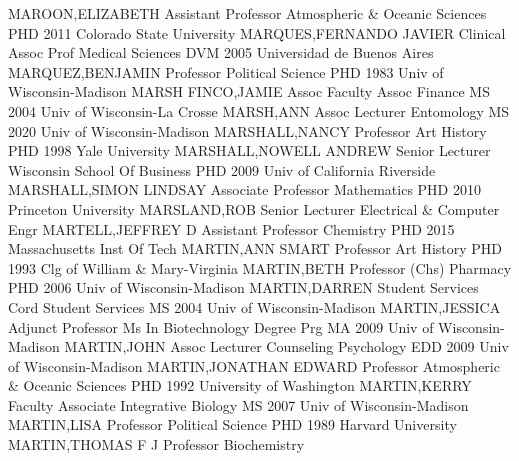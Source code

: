 \documentclass[
]{article}
\begin{document}
\textbar MAROON,ELIZABETH \textbar Assistant Professor
\textbar Atmospheric \& Oceanic Sciences \textbar PHD 2011 Colorado
State University \textbar{}  \textbar MARQUES,FERNANDO
JAVIER \textbar Clinical Assoc Prof \textbar Medical Sciences
\textbar DVM 2005 Universidad de Buenos Aires \textbar{} 
\textbar MARQUEZ,BENJAMIN \textbar Professor \textbar Political Science
\textbar PHD 1983 Univ of Wisconsin-Madison \textbar{} 
\textbar MARSH FINCO,JAMIE \textbar Assoc Faculty Assoc \textbar Finance
\textbar MS 2004 Univ of Wisconsin-La Crosse \textbar{} 
\textbar MARSH,ANN \textbar Assoc Lecturer \textbar Entomology
\textbar MS 2020 Univ of Wisconsin-Madison \textbar{} 
\textbar MARSHALL,NANCY \textbar Professor \textbar Art History
\textbar PHD 1998 Yale University \textbar{} 
\textbar MARSHALL,NOWELL ANDREW \textbar Senior Lecturer
\textbar Wisconsin School Of Business \textbar PHD 2009 Univ of
California Riverside \textbar{}  \textbar MARSHALL,SIMON
LINDSAY \textbar Associate Professor \textbar Mathematics \textbar PHD
2010 Princeton University \textbar{}  \textbar MARSLAND,ROB
\textbar Senior Lecturer \textbar Electrical \& Computer Engr
\textbar MARTELL,JEFFREY D \textbar{}  \textbar Assistant
Professor \textbar Chemistry \textbar PHD 2015 Massachusetts Inst Of
Tech \textbar MARTIN,ANN SMART \textbar{} 
\textbar Professor \textbar Art History \textbar PHD 1993 Clg of William
\& Mary-Virginia \textbar MARTIN,BETH \textbar{} 
\textbar Professor (Chs) \textbar Pharmacy \textbar PHD 2006 Univ of
Wisconsin-Madison \textbar MARTIN,DARREN \textbar{} 
\textbar Student Services Cord \textbar Student Services \textbar MS
2004 Univ of Wisconsin-Madison \textbar MARTIN,JESSICA \textbar{}
 \textbar Adjunct Professor \textbar Ms In Biotechnology
Degree Prg \textbar MA 2009 Univ of Wisconsin-Madison
\textbar MARTIN,JOHN \textbar{}  \textbar Assoc Lecturer
\textbar Counseling Psychology \textbar EDD 2009 Univ of
Wisconsin-Madison \textbar MARTIN,JONATHAN EDWARD \textbar{}
 \textbar Professor \textbar Atmospheric \& Oceanic Sciences
\textbar PHD 1992 University of Washington \textbar MARTIN,KERRY
\textbar{}  \textbar Faculty Associate \textbar Integrative
Biology \textbar MS 2007 Univ of Wisconsin-Madison \textbar MARTIN,LISA
\textbar{}  \textbar Professor \textbar Political Science
\textbar PHD 1989 Harvard University \textbar MARTIN,THOMAS F J
\textbar{}  \textbar Professor \textbar Biochemistry
\end{document}

